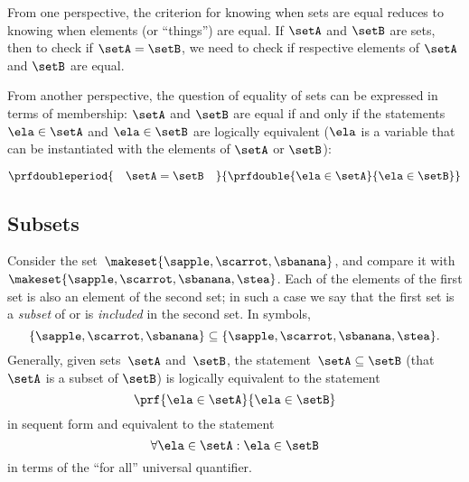 From one perspective, the criterion for knowing when sets are equal reduces to knowing when elements (or ``things'') are equal.
If $\setA$ and $\setB$ are sets, then to check if $\setA = \setB$, we need to check if respective elements of $\setA$ and $\setB$ are equal.

From another perspective, the question of equality of sets can be expressed in terms of membership: $\setA$ and $\setB$ are equal if and only if the statements $\ela \in \setA$ and $\ela \in \setB$ are logically equivalent ($\ela$ is a variable that can be instantiated with the elements of $\setA$ or $\setB$):

\begin{equation*}
    \prfdoubleperiod{
        \quad \setA = \setB \quad
    }{
        \prfdouble{
            \ela \in \setA
        }{
            \ela \in \setB
        }
    }
\end{equation*}


\subsection{Subsets}

Consider the set~$\makeset{ \sapple, \scarrot, \sbanana }$, and compare it with~$\makeset{ \sapple, \scarrot, \sbanana, \stea }$.
Each of the elements of the first set is also an element of the second set;
in such a case we say that the first set is a \emph{subset} of or is \emph{included} in the second set.
In symbols,
%
\begin{equation}
    \label{eq:subset}
    \{ \sapple, \scarrot, \sbanana \} \subseteq \{ \sapple, \scarrot, \sbanana, \stea \}.
\end{equation}
%
Generally, given sets~$\setA$ and~$\setB$, the statement~$\setA \subseteq \setB$ (that $\setA$ is a subset of $\setB$) is logically equivalent to the statement
%
\begin{equation}
    \prf{
        \ela \in \setA
    }{
        \ela \in \setB
    }
\end{equation}
in sequent form and equivalent to the statement
\begin{equation}\label{eq:inclusion-via-quantifier}
    \forall \ela \in \setA : \ela \in \setB
\end{equation}
in terms of the ``for all'' universal quantifier.

